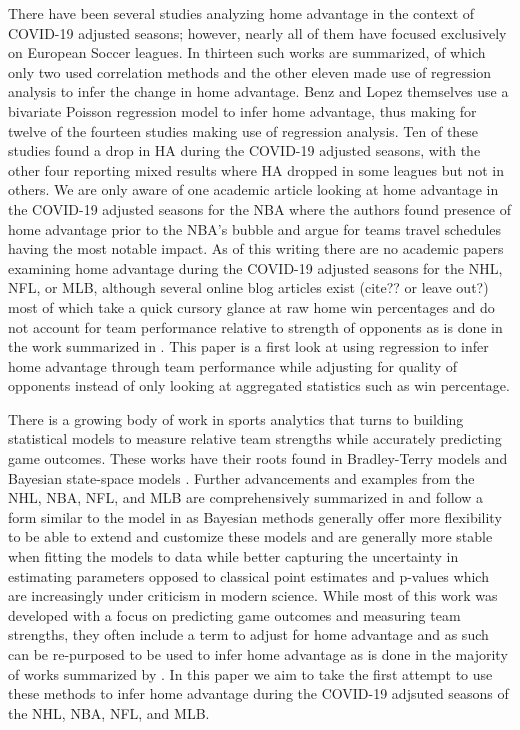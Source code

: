 There have been several studies analyzing home advantage in the context of COVID-19 adjusted seasons; however, nearly all of them have focused exclusively on European Soccer leagues. In \cite{Benz2020} thirteen such works are summarized, of which only two used correlation methods and the other eleven made use of regression analysis to infer the change in home advantage. Benz and Lopez themselves use a bivariate Poisson regression model to infer home advantage, thus making for twelve of the fourteen studies making use of regression analysis. Ten of these studies found a drop in HA during the COVID-19 adjusted seasons, with the other four reporting mixed results where HA dropped in some leagues but not in others. We are only aware of one academic article looking at home advantage in the COVID-19 adjusted seasons for the NBA \cite{McHill2020} where the authors found presence of home advantage prior to the NBA's bubble and argue for teams travel schedules having the most notable impact. As of this writing there are no academic papers examining home advantage during the COVID-19 adjusted seasons for the NHL, NFL, or MLB, although several online blog articles exist (cite?? or leave out?) most of which take a quick cursory glance at raw home win percentages and do not account for team performance relative to strength of opponents as is done in the work summarized in \cite{Benz2020}. This paper is a first look at using regression to infer home advantage through team performance while adjusting for quality of opponents instead of only looking at aggregated statistics such as win percentage.

There is a growing body of work in sports analytics that turns to building statistical models to measure relative team strengths while accurately predicting game outcomes. These works have their roots found in Bradley-Terry models \cite{Bradley1952} and Bayesian state-space models \cite{Glickman1998}. Further advancements and examples from the NHL, NBA, NFL, and MLB are comprehensively summarized in \cite{Lopez2018} and follow a form similar to the model in \cite{Baio2010} as Bayesian methods generally offer more flexibility to be able to extend and customize these models and are generally more stable when fitting the models to data \cite{GlickmanText2017} while better capturing the uncertainty in estimating parameters opposed to classical point estimates and p-values which are increasingly under criticism in modern science. While most of this work was developed with a focus on predicting game outcomes and measuring team strengths, they often include a term to adjust for home advantage and as such can be re-purposed to be used to infer home advantage as is done in the majority of works summarized by \cite{Benz2020}. In this paper we aim to take the first attempt to use these methods to infer home advantage during the COVID-19 adjsuted seasons of the NHL, NBA, NFL, and MLB.

